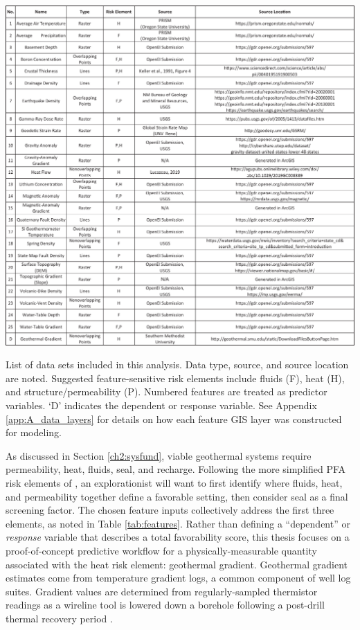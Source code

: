 \begin{table}
\centering
\includegraphics[width=\textwidth]{templates/images/Table-FeatureList_crop.pdf}
\caption[Southwestern New Mexico feature list]{List of data sets included in this analysis. Data type, source, and source location are noted. Suggested feature-sensitive risk elements include fluids (F), heat (H), and structure/permeability (P). Numbered features are treated as predictor variables. `D' indicates the dependent or response variable. See Appendix \ref{app:A_data_layers} for details on how each feature GIS layer was constructed for modeling.}
\label{tab:features}
\end{table}

As discussed in Section \ref{ch2:sysfund}, viable geothermal systems require permeability, heat, fluids, seal, and recharge. Following the more simplified PFA risk elements of \citet{bielicki_hydrogeolgic_2015}, an explorationist will want to first identify where fluids, heat, and permeability together define a favorable setting, then consider seal as a final screening factor. The chosen feature inputs collectively address the first three elements, as noted in Table \ref{tab:features}. Rather than defining a ``dependent'' or \textit{response} variable that describes a total favorability score, this thesis focuses on a proof-of-concept predictive workflow for a physically-measurable quantity associated with the heat risk element: geothermal gradient. Geothermal gradient estimates come from temperature gradient logs, a common component of well log suites. Gradient values are determined from regularly-sampled thermistor readings as a wireline tool is lowered down a borehole following a post-drill thermal recovery period \citep{prensky_temperature_1992}.

